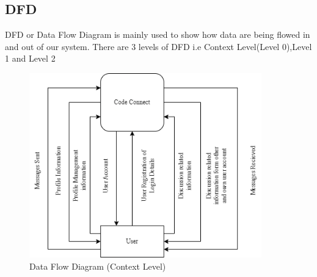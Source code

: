 \subsection{DFD}
DFD or Data Flow Diagram is mainly used to show how data are being flowed in and out of our system. There are 3 levels of DFD i.e Context Level(Level 0),Level 1 and Level 2
\begin{figure}[H]
    \centering
    \includegraphics[height = 8cm]{Diagrams/DFD.drawio.png}
    \caption{Data Flow Diagram (Context Level)}
\end{figure}
\newpage

